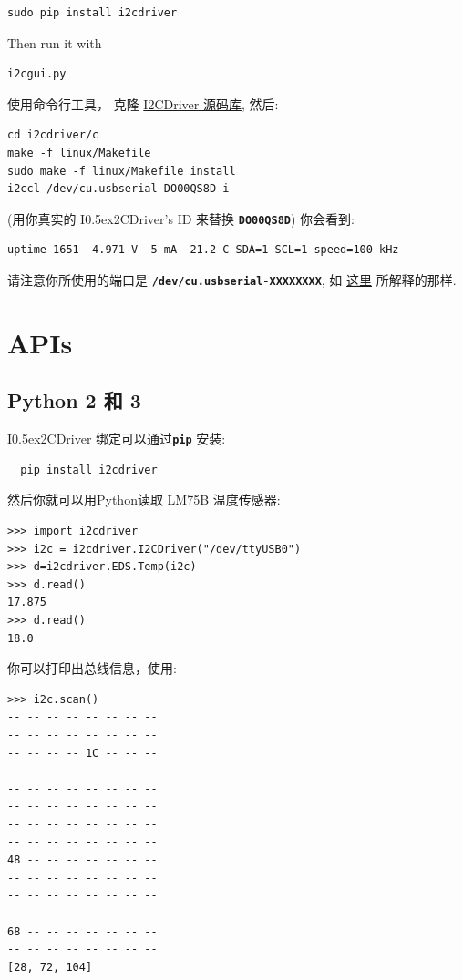 \documentclass{article}
\newcommand{\two}{\raise0.5ex\hbox{\footnotesize{2}}}
\newcommand{\iicdriver}{I\two{}CDriver}
\newcommand{\mach}[1]{\texttt{\textbf{#1}}}
\begin{document}
\begin{lstlisting}
sudo pip install i2cdriver
\end{lstlisting}

Then run it with

\begin{lstlisting}
i2cgui.py
\end{lstlisting}


使用命令行工具， 克隆
\href{https://github.com/jamesbowman/i2cdriver}{I2CDriver 源码库},
然后:

\begin{lstlisting}
cd i2cdriver/c
make -f linux/Makefile
sudo make -f linux/Makefile install
i2ccl /dev/cu.usbserial-DO00QS8D i
\end{lstlisting}

(用你真实的 \iicdriver{}'s ID 来替换 \mach{DO00QS8D})
你会看到:

\begin{lstlisting}
uptime 1651  4.971 V  5 mA  21.2 C SDA=1 SCL=1 speed=100 kHz
\end{lstlisting}

请注意你所使用的端口是 \mach{/dev/cu.usbserial-XXXXXXXX}, 如
\href{https://pbxbook.com/other/mac-tty.html}{这里} 所解释的那样.

\newpage
\section{APIs}

\subsection{Python 2 和 3}

\iicdriver{} 绑定可以通过\mach{pip} 安装:

\begin{lstlisting}
  pip install i2cdriver
\end{lstlisting}

然后你就可以用Python读取 LM75B 温度传感器:

\begin{lstlisting}
>>> import i2cdriver
>>> i2c = i2cdriver.I2CDriver("/dev/ttyUSB0")
>>> d=i2cdriver.EDS.Temp(i2c)
>>> d.read()
17.875
>>> d.read()
18.0
\end{lstlisting}

你可以打印出总线信息，使用:

\begin{lstlisting}
>>> i2c.scan()
-- -- -- -- -- -- -- -- 
-- -- -- -- -- -- -- -- 
-- -- -- -- 1C -- -- -- 
-- -- -- -- -- -- -- -- 
-- -- -- -- -- -- -- -- 
-- -- -- -- -- -- -- -- 
-- -- -- -- -- -- -- -- 
-- -- -- -- -- -- -- -- 
48 -- -- -- -- -- -- -- 
-- -- -- -- -- -- -- -- 
-- -- -- -- -- -- -- -- 
-- -- -- -- -- -- -- -- 
68 -- -- -- -- -- -- -- 
-- -- -- -- -- -- -- -- 
[28, 72, 104]
\end{lstlisting}
\end{document}
